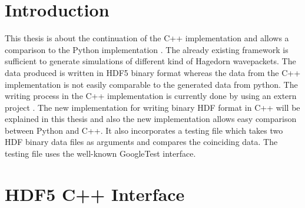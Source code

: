 \documentclass{article}
\begin{document}



\tableofcontents
\clearpage

\section{Introduction}
This thesis is about the continuation of the C++ implementation \cite{libwaveblocks} and allows a comparison to the Python implementation \cite{waveblocksnd}. The already existing framework is sufficient to generate simulations of different kind of Hagedorn wavepackets. The data produced is written in HDF5 binary format whereas the data from the C++ implementation is not easily comparable to the generated data from python. The writing process in the C++ implementation is currently done by using an extern project \cite{eigen3-hdf5}. The new implementation for writing binary HDF format in C++ will be explained in this thesis and also the new implementation allows easy comparison between Python and C++. It also incorporates a testing file which takes two HDF binary data files as arguments and compares the coinciding data. The testing file uses the well-known GoogleTest interface\cite{googletest}.

\section{HDF5 C++ Interface}
\end{document}
